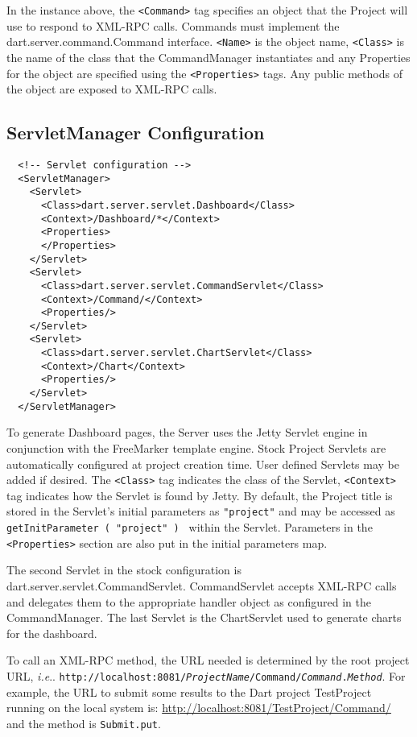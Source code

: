 \documentclass{InsightBook}
\makeatletter
\newcommand{\xmltag}[1]{\texttt{<#1>}}
\DeclareRobustCommand\onedot{\futurelet\@let@token\@onedot}
\def\@onedot{\ifx\@let@token.\else.\xspace\fi}
\def\ie{\emph{i.e}\onedot} \def\Ie{\emph{I.e}\onedot}
\makeatother
\begin{document}
In the instance above, the \xmltag{Command} tag specifies an object
that the Project will use to respond to XML-RPC calls.  Commands must
implement the dart.server.command.Command interface.  \xmltag{Name}
is the object name, \xmltag{Class} is the name of the class that the
CommandManager instantiates and any Properties for the object are
specified using the \xmltag{Properties} tags.  Any public methods of
the object are exposed to XML-RPC calls.

\subsection{ServletManager Configuration}
\label{Sec:ServletManager}
\begin{verbatim}
  <!-- Servlet configuration -->
  <ServletManager>
    <Servlet>
      <Class>dart.server.servlet.Dashboard</Class>
      <Context>/Dashboard/*</Context>
      <Properties>
      </Properties>
    </Servlet>
    <Servlet>
      <Class>dart.server.servlet.CommandServlet</Class>
      <Context>/Command/</Context>
      <Properties/>
    </Servlet>
    <Servlet>
      <Class>dart.server.servlet.ChartServlet</Class>
      <Context>/Chart</Context>
      <Properties/>
    </Servlet>
  </ServletManager>
\end{verbatim}
To generate Dashboard pages, the Server uses the Jetty Servlet
engine in conjunction with the FreeMarker template engine.  Stock
Project Servlets are automatically configured at project creation
time.  User defined Servlets may be added if desired.  The
\xmltag{Class} tag indicates the class of the Servlet,
\xmltag{Context} tag indicates how the Servlet is found by Jetty.
By default, the Project title is stored in the Servlet's initial
parameters as \texttt{"project"} and may be accessed as
\texttt{getInitParameter ( "project" ) } within the Servlet.
Parameters in the \xmltag{Properties} section are also put in the
initial parameters map.

The second Servlet in the stock configuration is
dart.server.servlet.CommandServlet.  CommandServlet accepts XML-RPC
calls and delegates them to the appropriate handler object as
configured in the CommandManager.  The last Servlet is the
ChartServlet used to generate charts for the dashboard.

To call an XML-RPC method, the URL needed is determined by the root
project URL, \ie
\texttt{http://localhost:8081/\emph{ProjectName}/Command/\emph{Command}.\emph{Method}}.
 For example, the URL to submit some results to the Dart project
TestProject running on the local system is:
\url{http://localhost:8081/TestProject/Command/} and the method is \texttt{Submit.put}.
\end{document}
